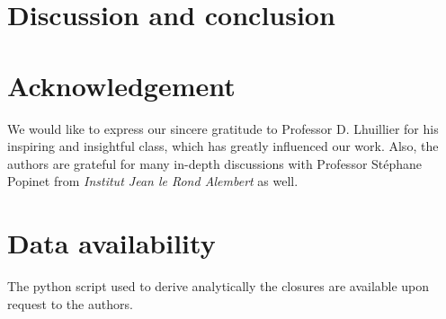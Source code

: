 \documentclass[11pt]{My_preprint}
\begin{document}
%
%

\section{Discussion and conclusion}



\section*{Acknowledgement}
We would like to express our sincere gratitude to Professor D. Lhuillier for his inspiring and insightful class, which has greatly influenced our work.
Also, the authors are grateful for many in-depth discussions with Professor St\'ephane Popinet from \textit{Institut Jean le Rond Alembert} as well. 

\section*{Data availability}

The python script used to derive analytically the closures are available upon request to the authors. 


\appendix



% 
%
%


\end{document}
